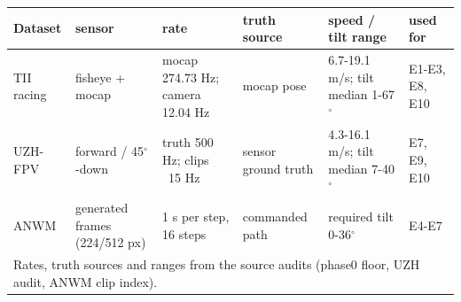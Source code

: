 \footnotesize
\begin{tabular}{llllll}
\toprule
Dataset & sensor & rate & truth source & speed / tilt range & used for \\
\midrule
TII racing & fisheye + mocap & mocap 274.73 Hz; camera 12.04 Hz & mocap pose & 6.7-19.1 m/s; tilt median 1-67$^\circ$ & E1-E3, E8, E10 \\
UZH-FPV & forward / 45$^\circ$-down & truth 500 Hz; clips ~15 Hz & sensor ground truth & 4.3-16.1 m/s; tilt median 7-40$^\circ$ & E7, E9, E10 \\
ANWM & generated frames (224/512 px) & 1 s per step, 16 steps & commanded path & required tilt 0-36$^\circ$ & E4-E7 \\
\bottomrule
\multicolumn{6}{l}{\footnotesize Rates, truth sources and ranges from the source audits (phase0 floor, UZH audit, ANWM clip index).} \\
\end{tabular}
